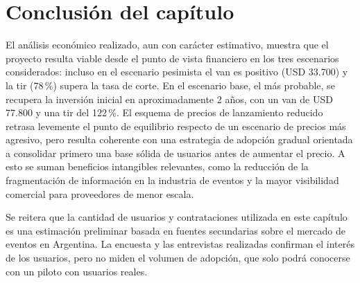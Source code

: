 \section{Conclusión del capítulo}

El análisis económico realizado, aun con carácter estimativo, muestra que
el proyecto resulta viable desde el punto de vista financiero en los tres
escenarios considerados: incluso en el escenario pesimista el \gls{van}
es positivo (USD 33.700) y la \gls{tir} (78\,\%) supera la tasa de corte.
En el escenario base, el más probable, se recupera la inversión inicial
en aproximadamente 2 años, con un \gls{van} de USD 77.800 y una \gls{tir}
del 122\,\%. El esquema de precios de lanzamiento reducido
retrasa levemente el punto de equilibrio respecto de un escenario de
precios más agresivo, pero resulta coherente con una estrategia de
adopción gradual orientada a consolidar primero una base sólida de
usuarios antes de aumentar el precio. A esto se suman beneficios
intangibles relevantes, como la reducción de la fragmentación de
información en la industria de eventos y la mayor visibilidad comercial
para proveedores de menor escala.

Se reitera que la cantidad de usuarios y contrataciones utilizada en
este capítulo es una estimación preliminar basada en fuentes secundarias
sobre el mercado de eventos en Argentina. La encuesta y las entrevistas
realizadas confirman el interés de los usuarios, pero no miden el
volumen de adopción, que solo podrá conocerse con un piloto con
usuarios reales.

